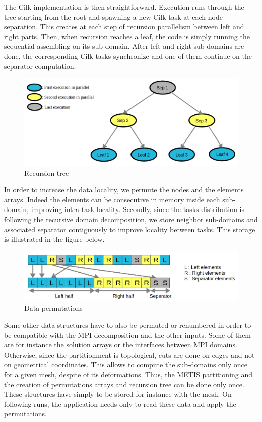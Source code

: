 \documentclass{IOS-Book-Article}
\begin{document}
The Cilk implementation is then straightforward. Execution runs through the tree starting from the root and spawning a new Cilk task at each node separation.
This creates at each step of recursion parallelism between left and right parts.
Then, when recursion reaches a leaf, the code is simply running the sequential assembling on its sub-domain.
After left and right sub-domains are done, the corresponding Cilk tasks synchronize and one of them continue on the separator computation.
\begin{figure}[htp]
 \centering
 \label{fig3}
 \includegraphics[scale=0.25]{Recursion_tree.png}
 \caption{Recursion tree}
\end{figure}
In order to increase the data locality, we permute the nodes and the elements arrays. Indeed the elements can be consecutive in memory inside each sub-domain,
improving intra-task locality.
Secondly, since the tasks distribution is following the recursive domain decomposition, we store neighbor sub-domains and associated separator contiguously to improve
locality between tasks.
This storage is illustrated in the figure below.
\begin{figure}[htp]
 \centering
 \label{fig4}
 \includegraphics[scale=0.25]{Data_permutations.png}
 \caption{Data permutations}
\end{figure}
Some other data structures have to also be permuted or renumbered in order to be compatible with the MPI decomposition and the other inputs.
Some of them are for instance the solution arrays or the interfaces between MPI domains.
Otherwise, since the partitionment is topological, cuts are done on edges and not on geometrical coordinates. This allows to compute the sub-domains only once
for a given mesh, despite of its deformations. Thus, the METIS partitioning and the creation of permutations arrays and recursion tree can be done only once.
These structures have simply to be stored for instance with the mesh. On following runs, the application needs only to read these data and apply the permutations.
\end{document}
